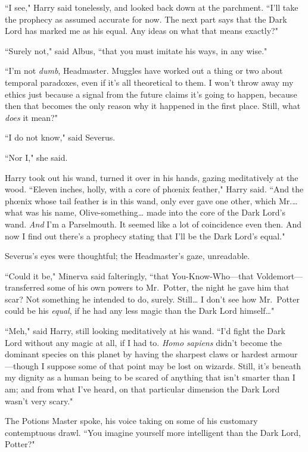 ``I see," Harry said tonelessly, and looked back down at the parchment. ``I'll take the prophecy as assumed accurate for now. The next part says that the Dark Lord has marked me as his equal. Any ideas on what that means exactly?"

``Surely not," said Albus, ``that you must imitate his ways, in any wise."

``I'm not \emph{dumb}, Headmaster. Muggles have worked out a thing or two about temporal paradoxes, even if it's all theoretical to them. I won't throw away my ethics just because a signal from the future claims it's going to happen, because then that becomes the only reason why it happened in the first place. Still, what \emph{does} it mean?"

``I do not know," said Severus.

``Nor I," she said.

Harry took out his wand, turned it over in his hands, gazing meditatively at the wood. ``Eleven inches, holly, with a core of phœnix feather," Harry said. ``And the phœnix whose tail feather is in this wand, only ever gave one other, which Mr.{\ldots} what was his name, Olive-something{\ldots} made into the core of the Dark Lord's wand. \emph{And} I'm a Parselmouth. It seemed like a lot of coincidence even then. And now I find out there's a prophecy stating that I'll be the Dark Lord's equal."

Severus's eyes were thoughtful; the Headmaster's gaze, unreadable.

``Could it be," Minerva said falteringly, ``that You-Know-Who—that Voldemort—transferred some of his own powers to Mr.~Potter, the night he gave him that scar? Not something he intended to do, surely. Still{\ldots} I don't see how Mr.~Potter could be his \emph{equal}, if he had any less magic than the Dark Lord himself{\ldots}"

``Meh," said Harry, still looking meditatively at his wand. ``I'd fight the Dark Lord without any magic at all, if I had to. \emph{Homo sapiens} didn't become the dominant species on this planet by having the sharpest claws or hardest armour—though I suppose some of that point may be lost on wizards. Still, it's beneath my dignity as a human being to be scared of anything that isn't smarter than I am; and from what I've heard, on that particular dimension the Dark Lord wasn't very scary."

The Potions Master spoke, his voice taking on some of his customary contemptuous drawl. ``You imagine yourself more intelligent than the Dark Lord, Potter?"

